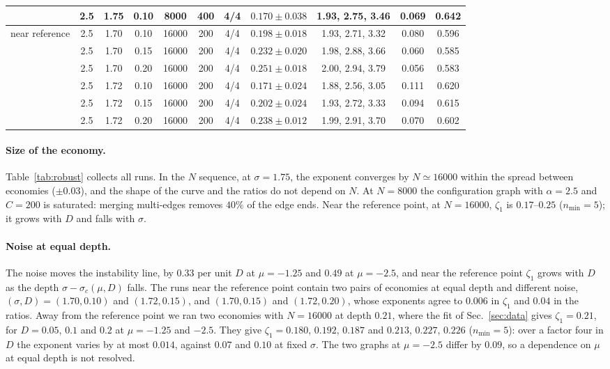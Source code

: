 \documentclass[pre,twocolumn,superscriptaddress,nofootinbib]{revtex4-2}
\begin{document}
\begin{table}[t]
\begin{ruledtabular}
\begin{tabular}{lcccccccccc}
 & 2.5 & 1.75 & 0.10 & 8000 & 400 & 4/4 & $0.170\pm0.038$ & 1.93, 2.75, 3.46 & 0.069 & 0.642\\
\hline
near reference & 2.5 & 1.70 & 0.10 & 16000 & 200 & 4/4 & $0.198\pm0.018$ & 1.93, 2.71, 3.32 & 0.080 & 0.596\\
 & 2.5 & 1.70 & 0.15 & 16000 & 200 & 4/4 & $0.232\pm0.020$ & 1.98, 2.88, 3.66 & 0.060 & 0.585\\
 & 2.5 & 1.70 & 0.20 & 16000 & 200 & 4/4 & $0.251\pm0.018$ & 2.00, 2.94, 3.79 & 0.056 & 0.583\\
 & 2.5 & 1.72 & 0.10 & 16000 & 200 & 4/4 & $0.171\pm0.024$ & 1.88, 2.56, 3.05 & 0.111 & 0.620\\
 & 2.5 & 1.72 & 0.15 & 16000 & 200 & 4/4 & $0.202\pm0.024$ & 1.93, 2.72, 3.33 & 0.094 & 0.615\\
 & 2.5 & 1.72 & 0.20 & 16000 & 200 & 4/4 & $0.238\pm0.012$ & 1.99, 2.91, 3.70 & 0.070 & 0.602\\
\end{tabular}
\end{ruledtabular}
\end{table}

\paragraph{Size of the economy.}  Table~\ref{tab:robust} collects all runs.  In the $N$ sequence, at
$\sigma=1.75$, the exponent converges by $N\simeq16000$ within the spread between economies ($\pm0.03$), and
the shape of the curve and the ratios do not depend on $N$.  At $N=8000$ the configuration graph with
$\alpha=2.5$ and $C=200$ is saturated: merging multi-edges removes $40\%$ of the edge ends.  Near the reference
point, at $N=16000$, $\zeta_1$ is $0.17$--$0.25$ ($n_{\min}=5$); it grows with $D$ and falls with $\sigma$.

\paragraph{Noise at equal depth.}  The noise moves the instability line, by $0.33$ per unit $D$ at $\mu=-1.25$
and $0.49$ at $\mu=-2.5$, and near the reference point $\zeta_1$ grows with $D$ as the depth
$\sigma-\sigma_c(\mu,D)$ falls.  The runs near the reference point contain two pairs of economies at equal depth and different noise, $(\sigma,D)=(1.70,0.10)$ and
$(1.72,0.15)$, and $(1.70,0.15)$ and $(1.72,0.20)$, whose exponents agree to $0.006$ in $\zeta_1$ and $0.04$ in
the ratios.  Away from the reference point we ran two economies with $N=16000$ at depth $0.21$, where the fit
of Sec.~\ref{sec:data} gives $\zeta_1=0.21$, for $D=0.05$, $0.1$ and $0.2$ at $\mu=-1.25$ and $-2.5$.  They
give $\zeta_1=0.180$, $0.192$, $0.187$ and $0.213$, $0.227$, $0.226$ ($n_{\min}=5$): over a factor four in $D$
the exponent varies by at most $0.014$, against $0.07$ and $0.10$ at fixed $\sigma$.  The two graphs at
$\mu=-2.5$ differ by $0.09$, so a dependence on $\mu$ at equal depth is not resolved.
\end{document}

